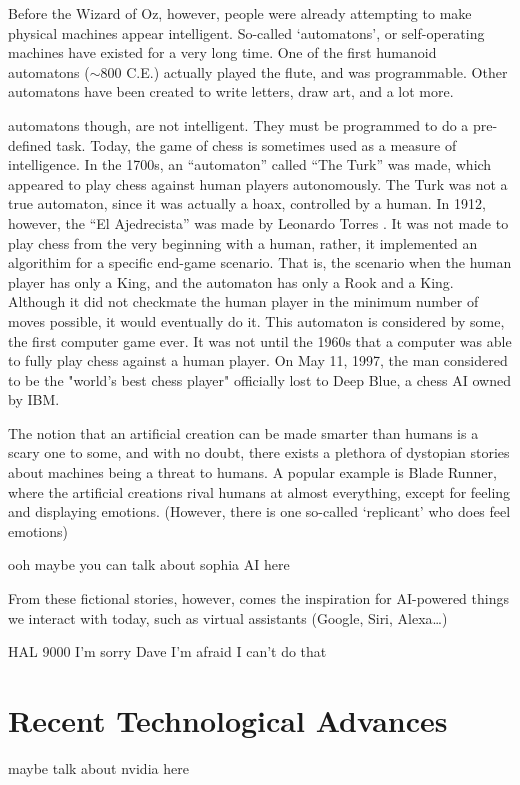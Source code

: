 \documentclass[letterpaper,12pt]{article}
\begin{document}
Before the Wizard of Oz, however, people were already attempting to make physical machines
appear intelligent. So-called `automatons', or self-operating machines have existed for
a very long time. One of the first humanoid automatons ($\sim$800 C.E.) actually played the flute, and was programmable.\cite{automaton}
Other automatons have been created to write letters, draw art, and a lot more.

automatons though, are not intelligent.
They must be programmed to do a pre-defined task.
Today, the game of chess is sometimes used as a measure of intelligence.
In the 1700s, an ``automaton'' called ``The Turk'' was made, which appeared to play chess
against human players autonomously\cite{turk}. The Turk was not a true automaton, since
it was actually a hoax, controlled by a human. In 1912, however, the ``El Ajedrecista''
was made by Leonardo Torres \cite{actualchessmachine}. It was not made to play chess from the
very beginning with a human, rather, it implemented an algorithim for a
specific end-game scenario. That is, the scenario when the human player has
only a King, and the automaton has only a Rook and a King. Although it did not
checkmate the human player in the minimum number of moves possible, it would
eventually do it.
This automaton is considered by some, the first computer game ever.
It was not until the 1960s that a computer was able to fully play chess against a human player.\cite{computerchess}
On May 11, 1997, the man considered to be the "world's best chess player" officially lost to Deep Blue,
a chess AI owned by IBM.\cite{computerchess}


The notion that an artificial creation can be made smarter than humans is a scary one to some,
and with no doubt, there exists a plethora of dystopian stories about machines being a threat to humans.
A popular example is Blade Runner, where the artificial creations rival humans
at almost everything, except for feeling and displaying emotions. (However, there is one so-called `replicant'
who does feel emotions)\cite{bladerunner}

ooh maybe you can talk about sophia AI here

From these fictional stories, however, comes the inspiration for AI-powered things we interact with
today, such as virtual assistants (Google, Siri, Alexa\dots) 

HAL 9000
I'm sorry Dave I'm afraid I can't do that


\section{Recent Technological Advances}
maybe talk about nvidia here
\end{document}
